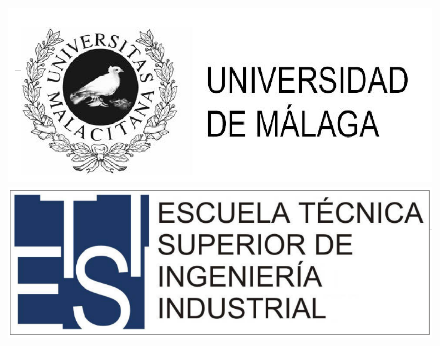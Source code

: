 
\begin{figure}[H]
        \hspace{-0.5cm}	
		\includegraphics[scale=0.25]{./1-Portada/img/uma}
		\hspace{6cm}
		\includegraphics[scale= 0.25]{./1-Portada/img/etsii}
\end{figure}
\vspace*{0.2in}
